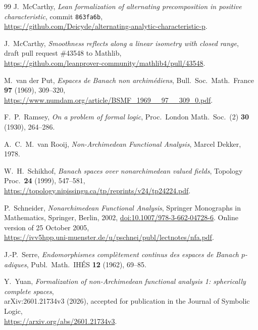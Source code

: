 \documentclass[11pt]{amsart}
\theoremstyle{definition}
\theoremstyle{remark}
\numberwithin{equation}{section}
\begin{document}
\begin{thebibliography}{99}
 J.~McCarthy, \emph{Lean formalization of alternating precomposition in positive characteristic},
commit \texttt{863fa6b},\\
{\small\url{https://github.com/Deicyde/alternating-analytic-characteristic-p}}.

 J.~McCarthy, \emph{Smoothness reflects along a linear isometry with closed range},\\ draft pull request \#43548
to Mathlib,\\ {\small\url{https://github.com/leanprover-community/mathlib4/pull/43548}}.

 M.~van der Put, \emph{Espaces de Banach non archim\'ediens}, Bull.\ Soc.\ Math.\ France
\textbf{97} (1969), 309--320,\\
{\small\url{https://www.numdam.org/article/BSMF_1969__97__309_0.pdf}}.

 F.~P.~Ramsey, \emph{On a problem of formal logic}, Proc.\ London Math.\ Soc.\ (2) \textbf{30} (1930), 264--286.

 A.~C.~M.~van Rooij, \emph{Non-Archimedean Functional Analysis}, Marcel Dekker, 1978.

 W.~H.~Schikhof, \emph{Banach spaces over nonarchimedean valued fields}, Topology Proc.\
\textbf{24} (1999), 547--581,\\
{\small\url{https://topology.nipissingu.ca/tp/reprints/v24/tp24224.pdf}}.

 P.~Schneider, \emph{Nonarchimedean Functional Analysis}, Springer Monographs in Mathematics,
Springer, Berlin, 2002, \href{https://doi.org/10.1007/978-3-662-04728-6}{doi:10.1007/978-3-662-04728-6}.
Online version of 25 October 2005,\\
{\small\url{https://ivv5hpp.uni-muenster.de/u/pschnei/publ/lectnotes/nfa.pdf}}.

 J.-P.~Serre, \emph{Endomorphismes compl\`etement continus des espaces de Banach $p$\nobreakdash-adiques}, Publ.\ Math.\
IH\'ES \textbf{12} (1962), 69--85.

 Y.~Yuan, \emph{Formalization of non-Archimedean functional analysis 1: spherically complete spaces},\\
arXiv:2601.21734v3 (2026), accepted for publication in the Journal of Symbolic Logic,\\
{\small\url{https://arxiv.org/abs/2601.21734v3}}.

\end{thebibliography}
\end{document}
